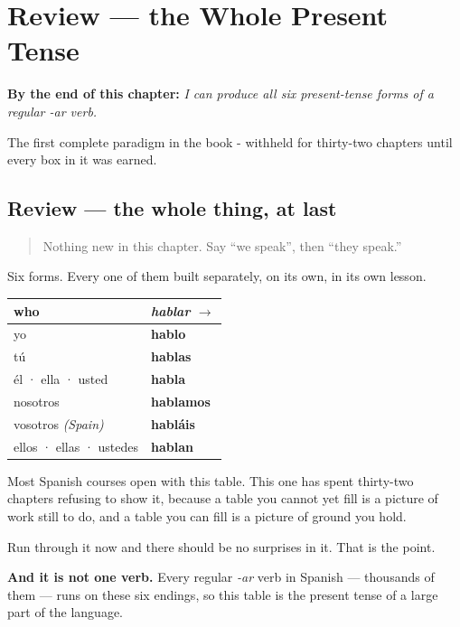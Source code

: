 
\chapter{Review --- the Whole Present Tense}
\label{ch:spanish-review-present-complete}

\begin{chapteropening}
\textbf{By the end of this chapter:} \emph{I can produce all six present-tense forms of a regular -ar verb.}

The first complete paradigm in the book - withheld for thirty-two chapters until every box in it was earned.
\end{chapteropening}

\section[Practice]{Review — the whole thing, at last}

\label{lesson:ES-C07-repaso-presente-completo}



\begin{quote}
Nothing new in this chapter. Say \textquotedblleft{}we speak\textquotedblright{}, then \textquotedblleft{}they speak.\textquotedblright{}
\end{quote}

\begin{grammarlens}[title={Grammar Lens: the table this book has been withholding}]
Six forms. Every one of them built separately, on its own, in its own lesson.

\noindent
\begin{tabularx}{\linewidth}{@{}>{\raggedright\arraybackslash}X>{\raggedright\arraybackslash}X@{}}
\toprule
\textbf{who} & \textbf{\emph{hablar} $\to$} \\
\midrule
yo & \textbf{hablo} \\
tú & \textbf{hablas} \\
él · ella · usted & \textbf{habla} \\
nosotros & \textbf{hablamos} \\
vosotros \emph{(Spain)} & \textbf{habláis} \\
ellos · ellas · ustedes & \textbf{hablan} \\
\bottomrule
\end{tabularx}

Most Spanish courses open with this table. This one has spent thirty-two chapters refusing to show it, because a table you cannot yet fill is a picture of work still to do, and a table you can fill is a picture of ground you hold.

Run through it now and there should be no surprises in it. That is the point.

\textbf{And it is not one verb.} Every regular \emph{-ar} verb in Spanish — thousands of them — runs on these six endings, so this table is the present tense of a large part of the language.
\end{grammarlens}

